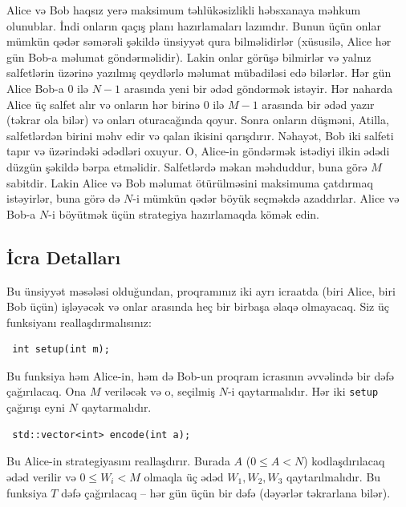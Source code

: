 \documentclass[12pt]{article}
\begin{document}
\renewcommand{\round}{Day 1}
\renewcommand{\problemName}{Həbsxana}
\renewcommand{\lang}{Azerbaijani}

\renewcommand{\tl}{$0.3$ sec.}
\renewcommand{\ml}{$256$ MB}
\problem{\problemName}

Alice və Bob haqsız yerə maksimum təhlükəsizlikli həbsxanaya məhkum olunublar. İndi onların qaçış planı hazırlamaları lazımdır. Bunun üçün onlar mümkün qədər səmərəli şəkildə ünsiyyət qura bilməlidirlər (xüsusilə, Alice hər gün Bob-a məlumat göndərməlidir). Lakin onlar görüşə bilmirlər və yalnız salfetlərin üzərinə yazılmış qeydlərlə məlumat mübadiləsi edə bilərlər. Hər gün Alice Bob-a $0$ ilə $N-1$ arasında yeni bir ədəd göndərmək istəyir. Hər naharda Alice üç salfet alır və onların hər birinə $0$ ilə $M-1$ arasında bir ədəd yazır (təkrar ola bilər) və onları oturacağında qoyur. Sonra onların düşməni, Atilla, salfetlərdən birini məhv edir və qalan ikisini qarışdırır. Nəhayət, Bob iki salfeti tapır və üzərindəki ədədləri oxuyur. O, Alice-in göndərmək istədiyi ilkin ədədi düzgün şəkildə bərpa etməlidir. Salfetlərdə məkan məhduddur, buna görə $M$ sabitdir. Lakin Alice və Bob məlumat ötürülməsini maksimuma çatdırmaq istəyirlər, buna görə də $N$-i mümkün qədər böyük seçməkdə azaddırlar. Alice və Bob-a $N$-i böyütmək üçün strategiya hazırlamaqda kömək edin.

\subsection{İcra Detalları}
Bu ünsiyyət məsələsi olduğundan, proqramınız iki ayrı icraatda (biri Alice, biri Bob üçün) işləyəcək və onlar arasında heç bir birbaşa əlaqə olmayacaq. Siz üç funksiyanı reallaşdırmalısınız:

\begin{lstlisting}
 int setup(int m);
\end{lstlisting}

Bu funksiya həm Alice-in, həm də Bob-un proqram icrasının əvvəlində bir dəfə çağırılacaq. Ona $M$ veriləcək və o, seçilmiş $N$-i qaytarmalıdır. Hər iki \texttt{setup} çağırışı eyni $N$ qaytarmalıdır.

\begin{lstlisting}
 std::vector<int> encode(int a);
\end{lstlisting}

Bu Alice-in strategiyasını reallaşdırır. Burada $A$ ($0 \leq A < N$) kodlaşdırılacaq ədəd verilir və $0 \leq W_i < M$ olmaqla üç ədəd $W_1, W_2, W_3$ qaytarılmalıdır. Bu funksiya $T$ dəfə çağırılacaq – hər gün üçün bir dəfə (dəyərlər təkrarlana bilər).
\end{document}
